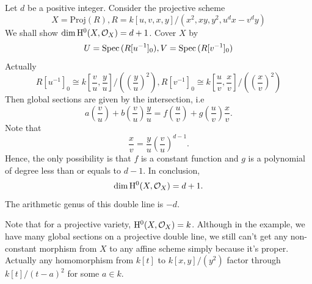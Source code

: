 \documentclass[../main.tex]{subfiles}
\begin{document}
\begin{example}
Let $d$ be a positive integer. Consider the projective scheme
$$X=\mathrm{Proj}(R), R=k[u,v,x,y]/(x^2,xy,y^2,u^{d}x-v^{d}y)$$
We shall show $\dim\mathrm{H}^{0}(X, \mathcal{O}_{X})=d+1$. Cover $X$ by 
$$U=\operatorname{Spec\,}(R[u^{-1}]_{0}), V=\operatorname{Spec\,}(R[v^{-1}]_{0})$$
Actually
$$R[u^{-1}]_{0}\cong k[\frac{v}{u}, \frac{y}{u}]/((\frac{y}{u})^{2}), R[v^{-1}]_{0}\cong k[\frac{u}{v},\frac{x}{v}]/((\frac{x}{v})^{2})$$
Then global sections are given by the intersection, i.e
$$a(\frac{v}{u})+b(\frac{v}{u})\frac{y}{u}=f(\frac{u}{v})+g(\frac{u}{v})\frac{x}{v}.$$
Note that 
$$\frac{x}{v}=\frac{y}{u}(\frac{v}{u})^{d-1}.$$
Hence, the only possibility is that $f$ is a constant function and $g$ is a polynomial of degree less than or equals to $d-1$. In conclusion,
$$\dim \mathrm{H}^{0}(X, \mathcal{O}_{X})=d+1.$$
The arithmetic genus of this double line is $-d$.
\end{example}
\begin{remark}
Note that for a projective variety, $\mathrm{H}^{0}(X, \mathcal{O}_{X})=k$. Although in the example, we have many global sections on a projective double line, we still can't get any non-constant morphism from $X$ to any affine scheme simply because it's proper. Actually any homomorphism from $k[t]$ to $k[x,y]/(y^{2})$ factor through $k[t]/(t-a)^{2}$ for some $a\in k$. 
\end{remark}
\end{document}
